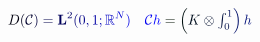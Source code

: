 \documentclass[12pt]{article}
\begin{document}
\makeatletter
\renewcommand*{\@textcolor}[3]{%
  \protect\leavevmode
  \begingroup
    \color#1{#2}#3%
  \endgroup
}
\makeatother
\begin{displaymath}
\begin{array} {rlr} & { { } \mathcolor[RGB]{0,0,15}{D} \mathcolor[RGB]{0,0,30}{(} \mathcal { \mathcolor[RGB]{0,0,45}{C} } \mathcolor[RGB]{0,0,60}{)} \mathcolor[RGB]{0,0,75}{=} \mathbf { \mathcolor[RGB]{0,0,90}{L} } ^ { \mathcolor[RGB]{0,0,105}{2} } \mathcolor[RGB]{0,0,120}{(} \mathcolor[RGB]{0,0,135}{0} \mathcolor[RGB]{0,0,150}{,} \mathcolor[RGB]{0,0,165}{1} \mathcolor[RGB]{0,0,180}{;} \mathbb { \mathcolor[RGB]{0,0,195}{R} } ^ { \mathcolor[RGB]{0,0,210}{N} } \mathcolor[RGB]{0,0,225}{)} } & { \mathcal { \mathcolor[RGB]{0,0,240}{C} } \mathcolor[RGB]{0,0,255}{h} \mathcolor[RGB]{0,15,0}{=} \mathcolor[RGB]{0,15,15}{\left(} \mathcolor[RGB]{0,15,30}{K} \mathcolor[RGB]{0,15,45}{\otimes} \mathcolor[RGB]{0,15,60}{\int} _ { \mathcolor[RGB]{0,15,75}{0} } ^ { \mathcolor[RGB]{0,15,90}{1} } \mathcolor[RGB]{0,15,105}{\right)} \mathcolor[RGB]{0,15,120}{h} } \end{array}
\end{displaymath}
\end{document}
